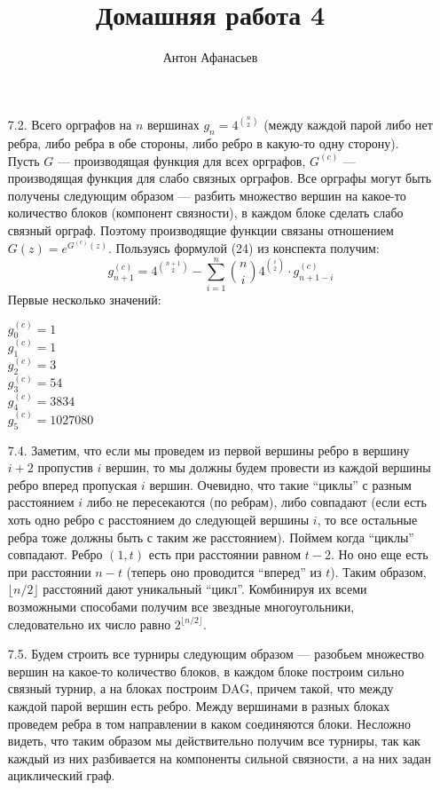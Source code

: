 \documentclass[10pt]{article}
\begin{document}
\title{Домашняя работа 4}
\author{Антон Афанасьев}
\maketitle

\begin{enumerate}
	\item[7.2.] Всего орграфов на $n$ вершинах $g_n = 4 ^{\binom{n}{2}}$ (между каждой парой либо нет ребра, либо ребра в обе стороны, либо ребро в какую-то одну сторону). Пусть $G$ --- производящая функция для всех орграфов, $G^{(c)}$ --- производящая функция для слабо связных орграфов. Все орграфы могут быть получены следующим образом --- разбить множество вершин на какое-то количество блоков (компонент связности), в каждом блоке сделать слабо связный орграф. Поэтому производящие функции связаны отношением $G(z) = e^{G^{(c)}(z)}$.
	Пользуясь формулой (24) из конспекта получим:
	$$g_{n+1}^{(c)} = 4^{\binom{n+1}{2}} - \sum_{i=1}^n \binom{n}{i} 4^{\binom{i}{2}} \cdot g^{(c)}_{n+1-i}$$
	Первые несколько значений:
	
$g_{0}^{(c)} = 1$ \\
$g_{1}^{(c)} = 1$ \\
$g_{2}^{(c)} = 3$ \\
$g_{3}^{(c)} = 54$ \\
$g_{4}^{(c)} = 3834$ \\
$g_{5}^{(c)} = 1027080$ \\

	\item[7.4.] Заметим, что если мы проведем из первой вершины ребро в вершину $i+2$ пропустив $i$ вершин, то мы должны будем провести из каждой вершины ребро вперед пропуская $i$ вершин. Очевидно, что такие ``циклы'' с разным расстоянием $i$ либо не пересекаются (по ребрам), либо совпадают (если есть хоть одно ребро с расстоянием до следующей вершины $i$, то все остальные ребра тоже должны быть с таким же расстоянием). Поймем когда ``циклы'' совпадают. Ребро $(1, t)$ есть при расстоянии равном $t-2$. Но оно еще есть при расстоянии $n-t$ (теперь оно проводится ``вперед'' из $t$). Таким образом, $\lfloor n/2 \rfloor$ расстояний дают уникальный ``цикл''. Комбинируя их всеми возможными способами получим все звездные многоугольники, следовательно их число равно $2^{\lfloor n/2 \rfloor}$.
	
	\item[7.5.] Будем строить все турниры следующим образом --- разобьем множество вершин на какое-то количество блоков, в каждом блоке построим сильно связный турнир, а на блоках построим DAG, причем такой, что между каждой парой вершин есть ребро. Между вершинами в разных блоках проведем ребра в том направлении в каком соединяются блоки. Несложно видеть, что таким образом мы действительно получим все турниры, так как каждый из них разбивается на компоненты сильной связности, а на них задан ациклический граф. 
	

\end{enumerate}
\end{document}
